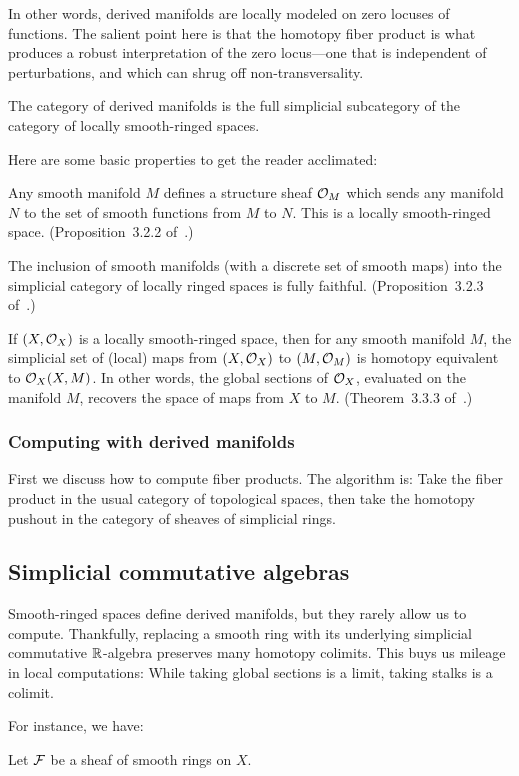In other words, derived manifolds are locally modeled on zero locuses of functions. The salient point here is that the homotopy fiber product is what produces a robust interpretation of the zero locus---one that is independent of perturbations, and which can shrug off non-transversality.

\begin{defn}
The category of derived manifolds is the full simplicial subcategory of the category of locally smooth-ringed spaces.
\end{defn}

Here are some basic properties to get the reader acclimated:

\begin{theorem}
\enum
	\item
		Any smooth manifold $M$ defines a structure sheaf $\mathcal O_M$ which sends any manifold $N$ to the set of smooth functions from $M$ to $N$. This is a locally smooth-ringed space. (Proposition~3.2.2 of~\cite{spivak-thesis}.)
	\item
		The inclusion of smooth manifolds (with a discrete set of smooth maps) into the simplicial category of locally ringed spaces is fully faithful. (Proposition~3.2.3 of~\cite{spivak-thesis}.) 
	\item
		If $(X,\mathcal O_X)$ is a locally smooth-ringed space, then for any smooth manifold $M$, the simplicial set of (local) maps from $(X,\mathcal O_X)$ to $(M,\mathcal O_M)$ is homotopy equivalent to $\mathcal O_X(X,M)$. In other words, the global sections of $\mathcal O_X$, evaluated on the manifold $M$, recovers the space of maps from $X$ to $M$. (Theorem~3.3.3 of~\cite{spivak-thesis}.) 
\enumd
\end{theorem}

\subsubsection{Computing with derived manifolds}
First we discuss how to compute fiber products. The algorithm is: Take the fiber product in the usual category of topological spaces, then take the homotopy pushout in the category of sheaves of simplicial rings.






\subsection{Simplicial commutative algebras}

Smooth-ringed spaces define derived manifolds, but they rarely allow us to compute. Thankfully, replacing a smooth ring with its underlying simplicial commutative $\mathbb R$-algebra preserves many homotopy colimits. This buys us mileage in local computations: While taking global sections is a limit, taking stalks is a colimit.

For instance, we have:

\begin{lemma}
Let $\mathcal F$ be a sheaf of smooth rings on $X$.

\end{lemma}



